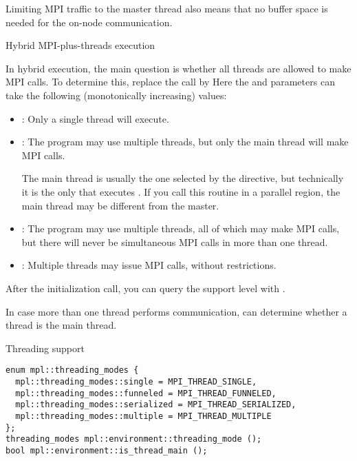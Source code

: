Limiting MPI traffic to the master thread also means that no buffer
space is needed for the on-node communication.

 {Hybrid MPI-plus-threads execution}
\label{sec:init-thread}
\label{sec:ref:mpi-thread}

In hybrid execution, the main question is whether all threads
are allowed to make MPI calls. To determine this,
replace the  call by
%
%
Here the  and  parameters can take the following
(monotonically increasing) values:
\begin{itemize}
\item {}: Only a single thread will
  execute.
\item{}: The program may use multiple
  threads, but only the main thread will make MPI calls.

    The main thread is usually the one selected by the
     directive, but technically it is the only that
    executes . If you call this routine in
    a parallel region, the main thread may be different from the master.
\item{}: The program may use multiple
  threads, all of which may make MPI calls, but there will never be
  simultaneous MPI calls in more than one thread.
\item{}: Multiple threads may issue MPI
  calls, without restrictions.
\end{itemize}

After the initialization call, you can query the support level
with .

In case more than one thread performs communication, 
can determine whether a thread is the main thread.

\begin{mplnote}{Threading support}
\begin{lstlisting}
enum mpl::threading_modes {
  mpl::threading_modes::single = MPI_THREAD_SINGLE, 
  mpl::threading_modes::funneled = MPI_THREAD_FUNNELED,
  mpl::threading_modes::serialized = MPI_THREAD_SERIALIZED,
  mpl::threading_modes::multiple = MPI_THREAD_MULTIPLE
};
threading_modes mpl::environment::threading_mode ();
bool mpl::environment::is_thread_main ();
\end{lstlisting}
\end{mplnote}

